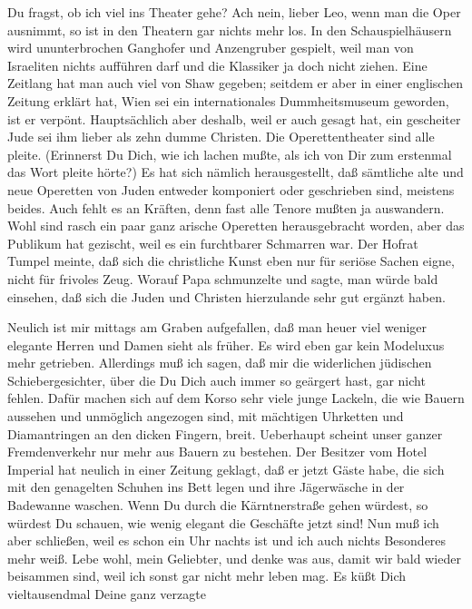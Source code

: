 Du fragst, ob ich viel ins Theater gehe? Ach nein,
lieber Leo, wenn man die Oper ausnimmt, so ist in den Theatern gar
nichts mehr los. In den Schauspielhäusern wird ununterbrochen
Ganghofer und Anzengruber gespielt, weil man von Israeliten nichts
aufführen darf und die Klassiker ja doch nicht ziehen. Eine
Zeitlang hat man auch viel von Shaw gegeben; seitdem er aber in
einer englischen Zeitung erklärt hat, Wien sei ein internationales
Dummheitsmuseum geworden, ist er verpönt. Hauptsächlich aber
deshalb, weil er auch gesagt hat, ein gescheiter Jude sei ihm
lieber als zehn dumme Christen. Die Operettentheater sind alle
pleite. (Erinnerst Du Dich, wie ich lachen mußte, als ich von Dir
zum erstenmal das Wort pleite hörte?) Es hat sich nämlich
herausgestellt, daß sämtliche alte und neue Operetten von Juden
entweder komponiert oder geschrieben sind, meistens beides. Auch
fehlt es an Kräften, denn fast alle Tenore mußten ja auswandern.
Wohl sind rasch ein paar ganz arische Operetten herausgebracht
worden, aber das Publikum hat gezischt, weil es ein furchtbarer
Schmarren war. Der Hofrat Tumpel meinte, daß sich die christliche
Kunst eben nur für seriöse Sachen eigne, nicht für frivoles Zeug.
Worauf Papa schmunzelte und sagte, man würde bald einsehen, daß
sich die Juden und Christen hierzulande sehr gut ergänzt haben.

Neulich ist mir mittags am Graben aufgefallen, daß man heuer viel
weniger elegante Herren und Damen sieht als früher. Es wird eben
gar kein Modeluxus mehr getrieben. Allerdings muß ich sagen, daß
mir die widerlichen jüdischen Schiebergesichter, über die Du Dich
auch immer so  geärgert hast, gar nicht fehlen.
Dafür machen sich auf dem Korso sehr viele junge Lackeln, die wie
Bauern aussehen und unmöglich angezogen sind, mit mächtigen
Uhrketten und Diamantringen an den dicken Fingern, breit.
Ueberhaupt scheint unser ganzer Fremdenverkehr nur mehr aus Bauern
zu bestehen. Der Besitzer vom Hotel Imperial hat neulich in einer
Zeitung geklagt, daß er jetzt Gäste habe, die sich mit den
genagelten Schuhen ins Bett legen und ihre Jägerwäsche in der
Badewanne waschen. Wenn Du durch die Kärntnerstraße gehen würdest,
so würdest Du schauen, wie wenig elegant die Geschäfte jetzt sind!
Nun muß ich aber schließen, weil es schon ein Uhr nachts ist und
ich auch nichts Besonderes mehr weiß. Lebe wohl, mein Geliebter,
und denke was aus, damit wir bald wieder beisammen sind, weil ich
sonst gar nicht mehr leben mag. Es küßt Dich vieltausendmal Deine
ganz verzagte


